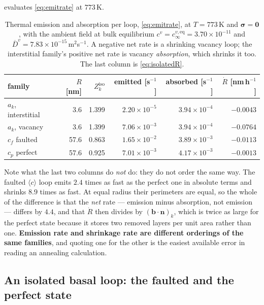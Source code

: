 \documentclass{article}
\newcommand{\cloop}{\ensuremath{\langle c\rangle}}
\newcommand{\bvec}{\bm b}
\newcommand{\nvec}{\bm n}
\begin{document}
 evaluates \cref{eq:emitrate} at $773\,$K.

\begin{table}[htbp]
\centering
\caption{Thermal emission and absorption per loop, \cref{eq:emitrate}, at
$T=773\,$K and $\bm\sigma=\bm0$, with the ambient field at bulk equilibrium
$c^{v}=c^{v,\mathrm{eq}}_\infty=3.70\times10^{-11}$ and
$\overline D^{v}=7.83\times10^{-15}\,$m$^2$s$^{-1}$. A negative net rate is a
shrinking vacancy loop; the interstitial family's positive net rate is vacancy
\emph{absorption}, which shrinks it too. The last column is
\cref{eq:isolatedR}.}
\label{tab:anneal-emission}
\begin{tabular}{@{}l r r r r r@{}}
\toprule
family & $R$ [nm] & $Z^{\mathrm{iso}}_k$ & emitted [s$^{-1}$]
 & absorbed [s$^{-1}$] & $\dot R$ [nm\,h$^{-1}$]\\
\midrule
$a_k$, interstitial & 3.6  & 1.399 & $2.20\times10^{-5}$ & $3.94\times10^{-4}$ & $-0.0043$\\
$a_k$, vacancy      & 3.6  & 1.399 & $7.06\times10^{-3}$ & $3.94\times10^{-4}$ & $-0.0764$\\
$c_f$ faulted       & 57.6 & 0.863 & $1.65\times10^{-2}$ & $3.89\times10^{-3}$ & $-0.0113$\\
$c_p$ perfect       & 57.6 & 0.925 & $7.01\times10^{-3}$ & $4.17\times10^{-3}$ & $-0.0013$\\
\bottomrule
\end{tabular}
\end{table}

Note what the last two columns do \emph{not} do: they do not order the same way.
The faulted \cloop{} loop emits $2.4$ times as fast as the perfect one in
absolute terms and shrinks $8.9$ times as fast. At equal radius their perimeters
are equal, so the whole of the difference is that the \emph{net} rate --- emission
minus absorption, not emission --- differs by $4.4$, and that $\dot R$ then
divides by $(\bvec\!\cdot\!\nvec)_k$, which is twice as large for the perfect
state because it stores two removed layers per unit area rather than one. \textbf{Emission rate and shrinkage rate are
different orderings of the same families}, and quoting one for the other is the
easiest available error in reading an annealing calculation.

\subsection{An isolated basal loop: the faulted and the perfect state}
\label{sec:anneal-isolated}
\end{document}
